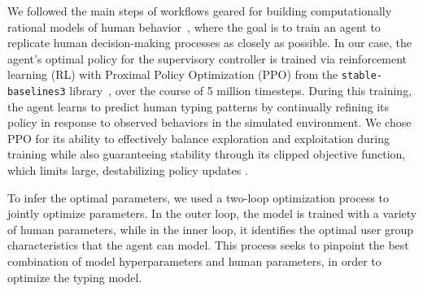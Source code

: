 \label{sec:optimization}
We followed the main steps of workflows geared for building computationally rational models of human behavior~\cite{chandramouli2024workflow}, where the goal is to train an agent to replicate human decision-making processes as closely as possible. In our case, the agent’s optimal policy for the supervisory controller is trained via reinforcement learning (RL) with Proximal Policy Optimization (PPO) from the \texttt{stable-baselines3} library~\cite{schulman2017proximal}, over the course of 5 million timesteps. During this training, the agent learns to predict human typing patterns by continually refining its policy in response to observed behaviors in the simulated environment. We chose PPO for its ability to effectively balance exploration and exploitation during training while also guaranteeing stability through its clipped objective function, which limits large, destabilizing policy updates \cite{schulman_proximal_2017}.


To infer the optimal parameters, we used a two-loop optimization process to jointly optimize parameters. In the outer loop, the model is trained with a variety of human parameters, while in the inner loop, it identifies the optimal user group characteristics that the agent can model. 
This process seeks to pinpoint the best combination of model hyperparameters and human parameters, in order to optimize the typing model.

